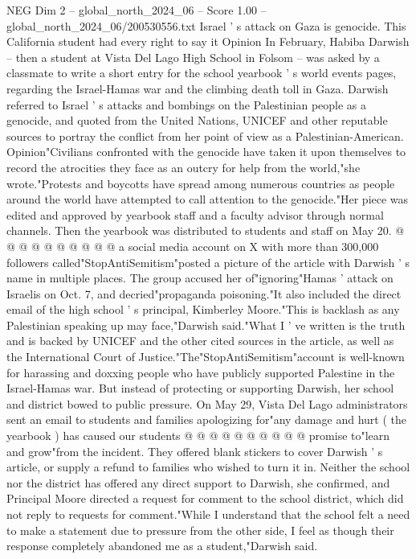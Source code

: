 \begin{textsample}{NEG Dim 2 – global\_north\_2024\_06 – Score 1.00 – global\_north\_2024\_06/200530556.txt}  \label{ex:f2_neg_131}
Israel ' s attack on Gaza is genocide.
This California student had every right to say it Opinion In February, Habiba Darwish -- then a student at Vista Del Lago High School in Folsom -- was asked by a classmate to write a short entry for the school yearbook ' s world events pages, regarding the Israel-Hamas war and the climbing death toll in Gaza.
Darwish referred to Israel ' s attacks and bombings on the Palestinian people as a genocide, and quoted from the United Nations, UNICEF and other reputable sources to portray the conflict from her point of view as a Palestinian-American.
Opinion"Civilians confronted with the genocide have taken it upon themselves to record the atrocities they face as an outcry for help from the world,"she wrote."Protests and boycotts have spread among numerous countries as people around the world have attempted to call attention to the genocide."Her piece was edited and approved by yearbook staff and a faculty advisor through normal channels.
Then the yearbook was distributed to students and staff on May 20. @ @ @ @ @ @ @ @ @ @ a social media account on X with more than 300,000 followers called"StopAntiSemitism"posted a picture of the article with Darwish ' s name in multiple places.
The group accused her of"ignoring"Hamas ' attack on Israelis on Oct. 7, and decried"propaganda poisoning."It also included the direct email of the high school ' s principal, Kimberley Moore."This is backlash as any Palestinian speaking up may face,"Darwish said."What I ' ve written is the truth and is backed by UNICEF and the other cited sources in the article, as well as the International Court of Justice."The"StopAntiSemitism"account is well-known for harassing and doxxing people who have publicly supported Palestine in the Israel-Hamas war.
But instead of protecting or supporting Darwish, her school and district bowed to public pressure.
On May 29, Vista Del Lago administrators sent an email to students and families apologizing for"any damage and hurt ( the yearbook ) has caused our students @ @ @ @ @ @ @ @ @ @ promise to"learn and grow"from the incident.
They offered blank stickers to cover Darwish ' s article, or supply a refund to families who wished to turn it in.
Neither the school nor the district has offered any direct support to Darwish, she confirmed, and Principal Moore directed a request for comment to the school district, which did not reply to requests for comment."While I understand that the school felt a need to make a statement due to pressure from the other side, I feel as though their response completely abandoned me as a student,"Darwish said.

\end{textsample}
